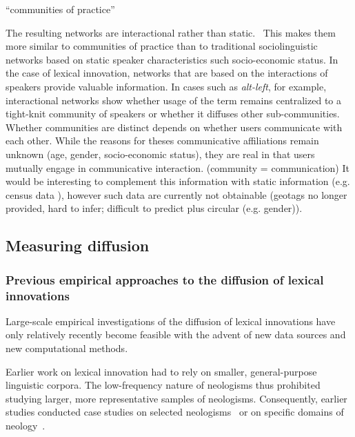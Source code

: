 \documentclass[
  a4paper,
  abstract=on,
  captions=tableabove
  ]{scrartcl}
\begin{document}
          \enquote{communities of practice} \parencite{Leuckert2020ChapterDigital} 

          The resulting networks are interactional rather than static.~\parencite{Goel2016SocialDynamics} This makes them more similar to communities of practice than to traditional sociolinguistic networks based on static speaker characteristics such socio-economic status.
          In the case of lexical innovation, networks that are based on the interactions of speakers provide valuable information. In cases such as \emph{alt-left}, for example, interactional networks show whether usage of the term remains centralized to a tight-knit community of speakers or whether it diffuses other sub-communities.
          Whether communities are distinct depends on whether users communicate with each other. While the reasons for theses communicative affiliations remain unknown (age, gender, socio-economic status), they are real in that users mutually engage in communicative interaction. (community = communication)
          It would be interesting to complement this information with static information (e.g. census data \parencite{Eisenstein2014DiffusionLexical}), however such data are currently not obtainable (geotags no longer provided, hard to infer; difficult to predict plus circular (e.g. gender)).


  \subsection{Measuring diffusion}
  
    \subsubsection{Previous empirical approaches to the diffusion of lexical innovations}

      Large-scale empirical investigations of the diffusion of lexical innovations have only relatively recently become feasible with the advent of new data sources and new computational methods.

      Earlier work on lexical innovation had to rely on smaller, general-purpose linguistic corpora. The low-frequency nature of neologisms thus prohibited studying larger, more representative samples of neologisms. Consequently, earlier studies conducted case studies on selected neologisms~\parencite{Hohenhaus2006BouncebackabilityWebascorpusbased} or on specific domains of neology~\parencite{Elsen2004Neologismen}.
\end{document}
